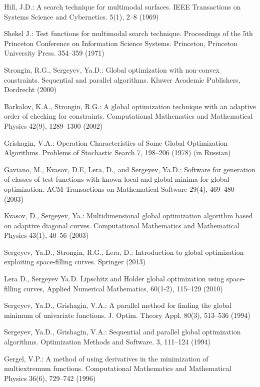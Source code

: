 \documentclass{llncs}
\begin{document}
\begin{thebibliography}{99}
Hill, J.D.: A search technique for multimodal surfaces. IEEE Transactions on Systems Science and Cybernetics. 5(1), 2--8 (1969)

Shekel J.: Test functions for multimodal search technique. Proceedings of the 5th Princeton Conference on Information Science Systems. Princeton, Princeton University Press. 354--359 (1971)

Strongin, R.G., Sergeyev, Ya.D.: Global optimization with non-convex constraints. Sequential and parallel algorithms. Kluwer Academic Publishers, Dordrecht (2000)

Barkalov, K.A., Strongin, R.G.: A global optimization technique with an adaptive order of checking for constraints. Computational Mathematics and Mathematical Physics 42(9), 1289--1300 (2002)

Grishagin, V.A.: Operation Characteristics of Some Global Optimization Algorithms. Problems
of Stochastic Search 7, 198--206 (1978) (in Russian)

Gaviano, M., Kvasov, D.E, Lera, D., and Sergeyev, Ya.D.: Software for generation of classes of test functions with known local and global minima for global optimization. ACM Transactions on Mathematical Software 29(4), 469--480 (2003)

Kvasov, D., Sergeyev, Ya.: Multidimensional global optimization algorithm based on adaptive diagonal curves. Computational Mathematics and Mathematical Physics 43(1), 40--56 (2003)

Sergeyev, Ya.D., Strongin, R.G., Lera, D.: Introduction to global optimization exploiting space-filling curves. Springer (2013)	

Lera D., Sergeyev Ya.D. Lipschitz and Holder global optimization using space-filling curves, Applied Numerical Mathematics, 60(1-2), 115--129 (2010)

Sergeyev, Ya.D., Grishagin, V.A.: A parallel method for finding the global minimum of univariate functions. J. Optim. Theory Appl. 80(3), 513--536 (1994)

Sergeyev, Ya.D., Grishagin, V.A.:  Sequential and parallel global optimization algorithms. Optimization Methods and Software. 3, 111--124 (1994)

Gergel, V.P.: A method of using derivatives in the minimization of multiextremum functions. Computational Mathematics and Mathematical Physics 36(6), 729--742 (1996)


\end{thebibliography}
\end{document}
